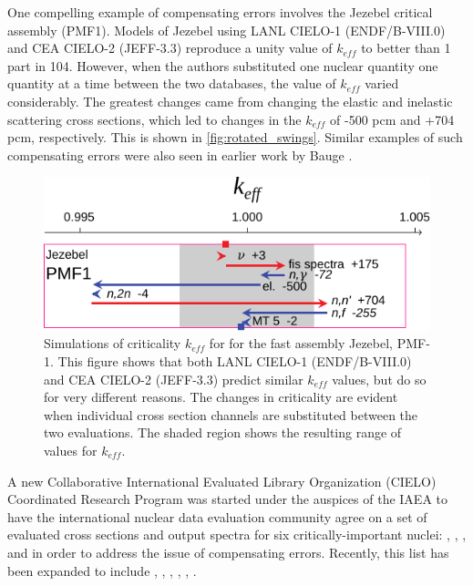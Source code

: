 \documentclass[letterpaper,draft]{ar-1col}
\begin{document}
One compelling example of compensating errors involves the Jezebel  critical assembly (PMF1).  Models of Jezebel using LANL CIELO-1 (ENDF/B-VIII.0) and CEA CIELO-2 (JEFF-3.3) reproduce a unity value of $k_{eff}$ to better than 1 part in 104.  However, when the authors substituted one nuclear quantity one quantity at a time between the two databases, the value of $k_{eff}$ varied considerably.  The greatest changes came from changing the elastic and inelastic scattering cross sections, which led to changes in the $k_{eff}$ of -500 pcm and +704 pcm, respectively. This is shown in \autoref{fig:rotated_swings}.   Similar examples of such compensating errors were also seen in earlier work by Bauge \cite{Bau12}.  

\begin{figure}
 \centering
 \includegraphics[width=0.8\linewidth]{rotated_swings.pdf}

 \caption{Simulations of criticality $k_{eff}$ for  for the fast assembly Jezebel, PMF-1. This figure shows that both LANL CIELO-1 (ENDF/B-VIII.0) and CEA CIELO-2 (JEFF-3.3) predict similar $k_{eff}$ values, but do so for very different reasons. The changes in criticality are evident when individual cross section channels are substituted between the two evaluations.  The shaded region shows the  resulting range of values for $k_{eff}$.}
 \label{fig:rotated_swings}
\end{figure}

A new Collaborative International Evaluated Library Organization (CIELO) Coordinated Research Program was started under the auspices of the IAEA \cite{Cha18a} to have the international nuclear data evaluation community agree on a set of evaluated cross sections and output spectra for six critically-important nuclei: , , ,  and  in order to address the issue of compensating errors.  Recently, this list has been expanded to include , , , , , .
\end{document}
